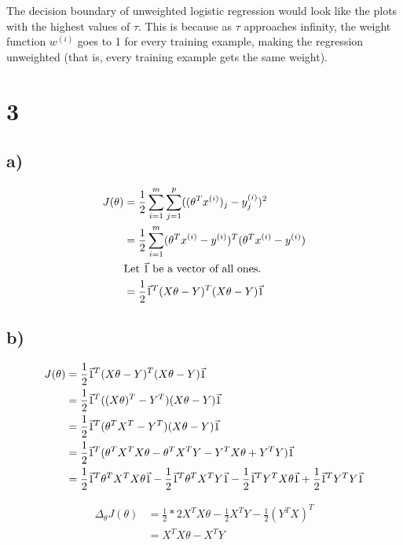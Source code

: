 \documentclass[11pt]{article}
\begin{document}
The decision boundary of unweighted logistic regression would look like the plots with the highest values of $\tau$. This is because as $\tau$ approaches infinity, the weight function $w^{(i)}$ goes to 1 for every training example, making the regression unweighted (that is, every training example gets the same weight).

\section*{3}

\subsection*{a)}

\begin{align*}
    J(\theta) &= \frac{1}{2} \sum_{i=1}^{m} \sum_{j=1}^p ((\theta^{T} x^{(i)})_j - y_j^{(i)})^2 \\
              &= \frac{1}{2} \sum_{i=1}^{m} (\theta^{T} x^{(i)} - y^{(i)})^T (\theta^{T} x^{(i)} - y^{(i)}) \\
              & \text{Let $\vec{1}$ be a vector of all ones.} \\
              &= \frac{1}{2} \vec{1}^T (X \theta - Y)^T (X \theta - Y) \vec{1} \\
\end{align*}

\subsection*{b)}

\begin{align*}
    J(\theta) &= \frac{1}{2} \vec{1}^T (X \theta - Y)^T (X \theta - Y) \vec{1} \\
              &= \frac{1}{2} \vec{1}^T ((X \theta)^T - Y^T) (X \theta - Y) \vec{1} \\
              &= \frac{1}{2} \vec{1}^T (\theta^{T} X^T - Y^T) (X \theta - Y) \vec{1} \\
              &= \frac{1}{2} \vec{1}^T (\theta^{T} X^T X \theta - \theta^{T} X^T Y - Y^T X \theta + Y^T Y) \vec{1} \\
              &= \frac{1}{2} \vec{1}^T \theta^{T} X^T X \theta \vec{1} - \frac{1}{2} \vec{1}^T \theta^{T} X^T Y \vec{1} - \frac{1}{2} \vec{1}^T Y^T X \theta \vec{1} + \frac{1}{2} \vec{1}^T Y^T Y \vec{1} \\
\end{align*}

\begin{align*}
    \Delta_\theta J(\theta) &= \frac{1}{2} * 2 X^T X \theta - \frac{1}{2} X^T Y - \frac{1}{2} (Y^T X)^T \\
                            &= X^T X \theta - X^T Y
\end{align*}
\end{document}
